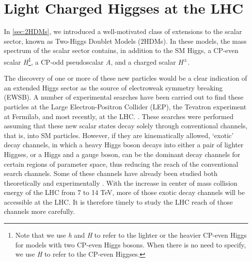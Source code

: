 \chapter{Light Charged Higgses at the LHC}\label{ch:LightChargedHiggs}

\def\h{h}
\def\H{H}
\def\A{A}
\newcommand{\sba}{\ensuremath{s_{\beta-\alpha}}}
\newcommand{\cba}{\ensuremath{\cos(\beta-\alpha)}}
\newcommand{\met}{\ensuremath{{\not\mathrel{E}}_T}}
\newcommand{\ifb}{\ensuremath{ \text{fb}^{-1} }}
\newcommand{\cmark}{\ding{51}}%
\newcommand{\xmark}{\ding{55}}%

In \autoref{sec:2HDMs}, we introduced a well-motivated class of extensions to the scalar sector, known as Two-Higgs Doublet Models ($2$HDMs). In these models, the mass spectrum of the scalar sector contains, in addition to the SM Higgs, a CP-even scalar \emph{H}\footnote{Note that we use \emph{h} and \emph{H} to refer to the lighter or the heavier CP-even Higgs for models with two CP-even Higgs bosons. When there is no need to specify, we use \emph{H} to refer to the CP-even Higgses.}, a CP-odd pseudoscalar \emph{A}, and a charged scalar $H^\pm$. 

The discovery of one or more of these new particles would be a clear indication of an extended Higgs sector as the source of electroweak symmetry breaking (EWSB). A number of experimental searches have been carried out to find these particles at the Large Electron-Positron Collider (LEP), the Tevatron experiment at Fermilab, and most recently, at the LHC. \cite{LEP_Higgs, Aad:2014vgg, Khachatryan:2014wca, TheATLAScollaboration:2013wia, CMS:2014cdp, Aad:2013hla, CMS:2014kga, Khachatryan:2015cwa}. These searches were performed assuming that these new scalar states decay solely through conventional channels, that is, into SM particles. However, if they are kinematically allowed, `exotic' decay channels, in which a heavy Higgs boson decays into either a pair of lighter Higgses, or a Higgs and a gauge boson, can be the dominant decay channels for certain regions of parameter space, thus reducing the reach of the conventional search channels. Some of these channels have already been studied both theoretically \cite{Curtin:2013fra, Brownson:2013lka, Coleppa:2014hxa, Coleppa:2014cca,Li:2015lra,Dorsch:2014qja,Chen:2013emb,Chen:2014dma,Enberg:2014pua} and experimentally \cite{Aad:2015wra, CMS:2014yra,CMS:2013eua}. With the increase in center of mass collision energy of the LHC from 7 to 14 TeV, more of those exotic decay channels will be accessible at the LHC. It is therefore timely to study the LHC reach of those channels more carefully.

